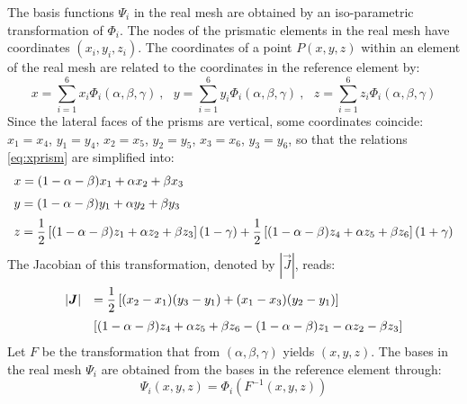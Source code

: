 The basis functions $\Psi_i$ in the real mesh are obtained by an 
iso-parametric transformation of $\Phi_i$. The nodes of the prismatic elements 
in the real mesh have coordinates $(x_i, y_i, z_i)$. 
The coordinates of a point $P(x, y, z)$ within an element of the real mesh
are related to the coordinates in the reference element by:
\begin{equation}
x=\sum_{i=1}^6x_i\Phi_i(\alpha,\beta,\gamma)~,~~~y=\sum_{i=1}^6y_i\Phi_i(\alpha,\beta,\gamma)~,~~~z=\sum_{i=1}^6z_i\Phi_i(\alpha,\beta,\gamma)
\label{eq:xprism}
\end{equation}
Since the lateral faces of the prisms are vertical, some coordinates coincide: 
$x_1=x_4$, $y_1=y_4$, $x_2=x_5$, $y_2=y_5$, $x_3=x_6$, $y_3=y_6$, so that the
relations \eqref{eq:xprism} are simplified into:
\begin{equation}
\begin{array}{l}
x = (1-\alpha-\beta)x_1+\alpha x_2+\beta x_3 \medskip\\
y = (1-\alpha-\beta)y_1+\alpha y_2+\beta y_3 \medskip\\
z = \dfrac{1}{2}\left[(1-\alpha-\beta)z_1+\alpha z_2+\beta z_3\right](1-\gamma)+
 \dfrac{1}{2}\left[(1-\alpha-\beta)z_4+\alpha z_5+\beta z_6\right](1+\gamma)
\end{array}
\end{equation}
The Jacobian of this transformation, denoted by $|\vec{J}|$, reads:
\begin{equation}
\begin{array}{ll}
|\vec{J}|& =\dfrac{1}{2}\left[(x_2-x_1)(y_3-y_1)+(x_1-x_3)(y_2-y_1)\right]\medskip \\
& \left[(1-\alpha-\beta)z_4+\alpha z_5+\beta z_6-(1-\alpha-\beta)z_1-\alpha z_2
-\beta z_3\right]
\end{array}
\label{eq:jacobian}
\end{equation}
Let $F$ be the transformation that from $(\alpha, \beta, \gamma)$ 
yields $(x,y,z)$. The bases in the real mesh $\Psi_i$ are obtained 
from the bases in the reference element through:
\begin{equation}
\Psi_i(x,y,z)=\Phi_i(F^{-1}(x,y,z))
\label{eq:transfF}
\end{equation}

